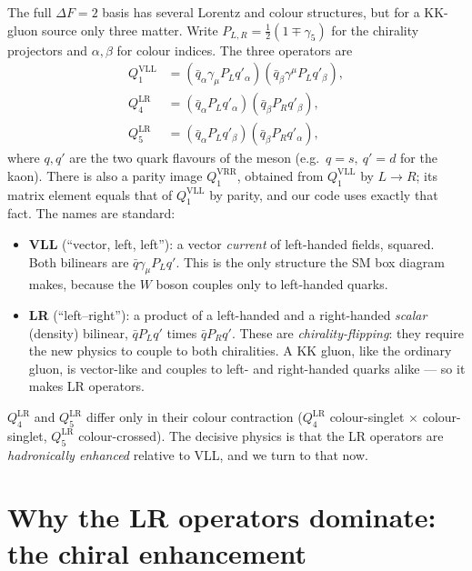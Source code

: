 \documentclass[11pt]{article}
\newcommand{\half}{\tfrac{1}{2}}
\newcommand{\QVLL}{Q_1^{\mathrm{VLL}}}
\newcommand{\QVRR}{Q_1^{\mathrm{VRR}}}
\newcommand{\QLRfour}{Q_4^{\mathrm{LR}}}
\newcommand{\QLRfive}{Q_5^{\mathrm{LR}}}
\theoremstyle{definition}
\begin{document}
The full $\Delta F=2$ basis has several Lorentz and colour structures, but for a
KK-gluon source only three matter. Write $P_{L,R}=\half(1\mp\gamma_5)$ for the
chirality projectors and $\alpha,\beta$ for colour indices. The three operators
are
\begin{align}
\QVLL  &= (\bar q_\alpha \gamma_\mu P_L q'_\alpha)(\bar q_\beta \gamma^\mu P_L q'_\beta),
\label{eq:QVLL}\\
\QLRfour &= (\bar q_\alpha P_L q'_\alpha)(\bar q_\beta P_R q'_\beta),
\label{eq:QLR4}\\
\QLRfive &= (\bar q_\alpha P_L q'_\beta)(\bar q_\beta P_R q'_\alpha),
\label{eq:QLR5}
\end{align}
where $q,q'$ are the two quark flavours of the meson (e.g.\ $q=s,\ q'=d$ for the
kaon). There is also a parity image $\QVRR$, obtained from $\QVLL$ by $L\to R$;
its matrix element equals that of $\QVLL$ by parity, and our code uses exactly
that fact. The names are standard:
\begin{itemize}[leftmargin=1.4em]
\item \textbf{VLL} (``vector, left, left''): a vector \emph{current} of
left-handed fields, squared. Both bilinears are $\bar q\gamma_\mu P_L q'$. This is
the only structure the SM box diagram makes, because the $W$ boson couples only to
left-handed quarks.
\item \textbf{LR} (``left--right''): a product of a left-handed and a
right-handed \emph{scalar} (density) bilinear, $\bar q P_L q'$ times
$\bar q P_R q'$. These are \emph{chirality-flipping}: they require the new physics
to couple to both chiralities. A KK gluon, like the ordinary gluon, is
vector-like and couples to left- and right-handed quarks alike --- so it makes
LR operators.
\end{itemize}
$\QLRfour$ and $\QLRfive$ differ only in their colour contraction ($\QLRfour$
colour-singlet $\times$ colour-singlet, $\QLRfive$ colour-crossed). The decisive
physics is that the LR operators are \emph{hadronically enhanced} relative to
VLL, and we turn to that now.

\section{Why the LR operators dominate: the chiral enhancement}
\label{sec:chiral}
\end{document}
